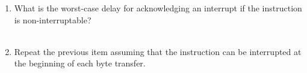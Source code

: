 \documentclass[12pt]{article}
\begin{document}
\begin{enumerate}[itemsep=3em]
\begin{enumerate}[itemsep=3em]
			\item{What is the worst-case delay for acknowledging an interrupt if the instruction is non-interruptable?}\\ \\
		
			\item{Repeat the previous item assuming that the instruction can be interrupted at the beginning of each byte transfer.}\\ \\
			\fbox{\parbox{\linewidth}{
			
			}}

		\end{enumerate}
	\end{enumerate}
\end{document}
